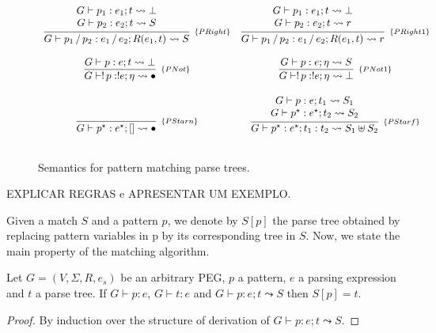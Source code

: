 \begin{figure}[H]
\[\begin{array}{cc}
      \infer[_{\{PRight\}}]{G \vdash p_1\,/\,p_2 : e_1\,/\,e_2; R(e_1, t) \leadsto S}
                       {\begin{array}{c}
                          G\vdash p_1 :e_1 ; t \leadsto \bot \\
                          G\vdash p_2 :e_2 ; t\leadsto S
                       \end{array}} &
      \infer[_{\{PRight1\}}]{G \vdash p_1\,/\,p_2 : e_1\,/\,e_2; R(e_1, t) \leadsto r}
                       {\begin{array}{c}
                          G\vdash p_1 : e_1 ; t \leadsto \bot\\
                          G\vdash p_2 : e_2; t \leadsto r
                        \end{array}} \\ \\
      \infer[_{\{PNot\}}]{G \vdash !\,p : ! e ; \eta \leadsto \bullet}
                      {G \vdash p : e ; t \leadsto \bot} &
      \infer[_{\{PNot1\}}]{G \vdash !\,p : ! e ; \eta \leadsto \bot}
                       {G \vdash p : e ; \eta \leadsto S}\\ \\

      \infer[_{\{PStarn\}}]{G \vdash p^\star : e^\star ; [] \leadsto \bullet}{} &
      \infer[_{\{PStarf\}}]{G\vdash p^\star : e^\star ; t_1 : t_2 \leadsto S_1 \uplus S_2}
                        {\begin{array}{c}
                           G \vdash p : e ; t_1 \leadsto S_1\\
                           G \vdash p^\star : e^\star ; t_2 \leadsto S_2
                         \end{array}}\\ \\
    \end{array}
  \]
  \centering
  \caption{Semantics for pattern matching parse trees.}
  \label{fig:pattern-semantics}
\end{figure}

EXPLICAR REGRAS e APRESENTAR UM EXEMPLO.

Given a match $S$ and a pattern $p$, we denote by $S[p]$ the parse tree
obtained by replacing pattern variables in p by its corresponding tree
in $S$. Now, we state the main property of the matching algorithm.

\begin{theorem}\label{thm:matching-correct}
  Let $G = (V,\Sigma,R, e_s)$ be an arbitrary PEG, $p$ a pattern,
  $e$ a parsing expression and $t$ a parse tree. If $G \vdash p : e$, $G \vdash t : e$ and
  $G\vdash p : e ; t \leadsto S$ then $S[p] = t$.
\end{theorem}
\begin{proof}
  By induction over the structure of derivation of $G\vdash p : e ; t \leadsto S$.
\end{proof}

